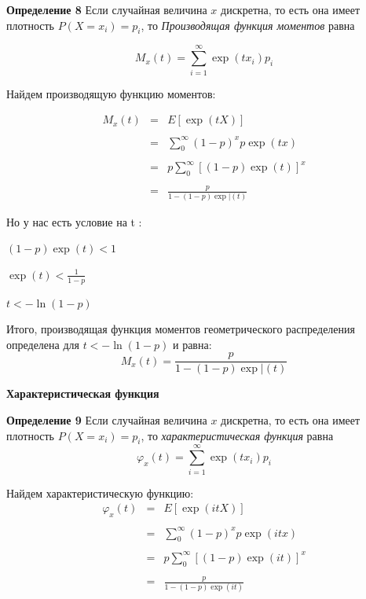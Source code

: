 \documentclass[a4paper,12pt, oneside]{book}
\begin{document}
{\normalsize{\textbf{Определение 8}} Если случайная величина $x$ дискретна, то есть она имеет плотность $P(X = x_i) = p_i$, то \textit{ Производящая функция моментов } равна

$$
M_x(t) =  \sum\limits_{i=1}^{\infty} \exp(tx_i) p_i
$$


Найдем производящую функцию моментов:

$$
\begin{array}{rcl}
M_x(t) &=& E[\exp(tX)] \\
\\
&=&\sum\limits_{0}^{\infty} (1 - p)^x p \exp(tx)\\
\\
&=& p \sum\limits_{0}^{\infty} [(1 - p)  \exp(t)]^x\\
\\
&=& \frac{p}{1-(1-p)\exp|(t)}
\end{array}
$$

\vspace{5mm}
Но у нас есть условие на t :
\vspace{3mm}

$(1 - p)  \exp(t) < 1 $
\vspace{3mm}

$\exp(t) < \frac{1}{1-p}$
\vspace{3mm}

$t < -\ln(1-p)$

\vspace{5mm}
Итого, производящая функция моментов геометрического распределения определена для $t < -\ln(1-p)$ и равна:
$$
M_x(t) = \frac{p}{1-(1-p)\exp|(t)}
$$


\newpage
\large{\textbf{{Характеристическая функция}}}
\vspace{5mm}

\normalsize{\textbf{Определение 9  }}Если случайная величина $x$ дискретна, то есть она имеет плотность $P(X = x_i) = p_i$, то \textit{ характеристическая функция } равна
$$
\varphi_x(t) =  \sum\limits_{i=1}^{\infty} \exp(tx_i) p_i
$$

Найдем характеристическую функцию:
$$
\begin{array}{rcl}
\varphi_x(t) &=& E[\exp(itX)]\\
\\
&=&\sum\limits_{0}^{\infty} (1-p)^x p \exp(itx)\\
\\
&=&p \sum\limits_{0}^{\infty} [(1-p)\exp(it)]^x\\
\\
&=&\frac{p}{1-(1-p)\exp(it)}
\end{array}
$$

}
\end{document}
